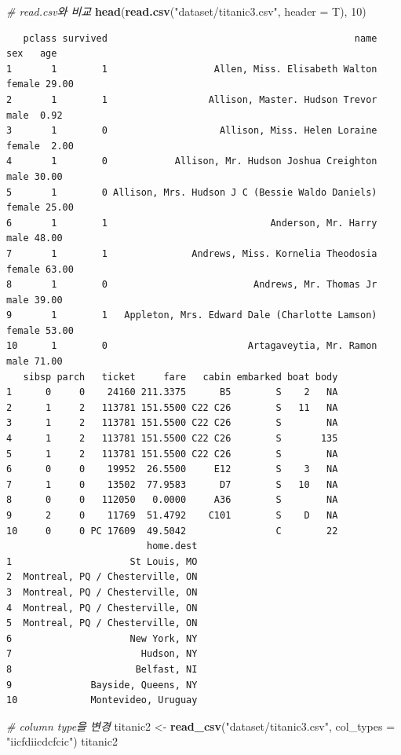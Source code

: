 \documentclass[
  11pt,
]{krantz}
\newenvironment{Shaded}{\begin{snugshade}}{\end{snugshade}}
\newcommand{\CommentTok}[1]{\textcolor[rgb]{0.37,0.37,0.37}{\textit{#1}}}
\newcommand{\DataTypeTok}[1]{\textcolor[rgb]{0.27,0.27,0.27}{#1}}
\newcommand{\DecValTok}[1]{\textcolor[rgb]{0.06,0.06,0.06}{#1}}
\newcommand{\KeywordTok}[1]{\textcolor[rgb]{0.27,0.27,0.27}{\textbf{#1}}}
\newcommand{\NormalTok}[1]{#1}
\newcommand{\StringTok}[1]{\textcolor[rgb]{0.5,0.5,0.5}{#1}}
\begin{document}
\begin{Shaded}
\begin{Highlighting}[]
\CommentTok{# read.csv와 비교}
\KeywordTok{head}\NormalTok{(}\KeywordTok{read.csv}\NormalTok{(}\StringTok{"dataset/titanic3.csv"}\NormalTok{, }\DataTypeTok{header =}\NormalTok{ T), }\DecValTok{10}\NormalTok{)}
\end{Highlighting}
\end{Shaded}

\begin{verbatim}
   pclass survived                                            name    sex   age
1       1        1                   Allen, Miss. Elisabeth Walton female 29.00
2       1        1                  Allison, Master. Hudson Trevor   male  0.92
3       1        0                    Allison, Miss. Helen Loraine female  2.00
4       1        0            Allison, Mr. Hudson Joshua Creighton   male 30.00
5       1        0 Allison, Mrs. Hudson J C (Bessie Waldo Daniels) female 25.00
6       1        1                             Anderson, Mr. Harry   male 48.00
7       1        1               Andrews, Miss. Kornelia Theodosia female 63.00
8       1        0                          Andrews, Mr. Thomas Jr   male 39.00
9       1        1   Appleton, Mrs. Edward Dale (Charlotte Lamson) female 53.00
10      1        0                         Artagaveytia, Mr. Ramon   male 71.00
   sibsp parch   ticket     fare   cabin embarked boat body
1      0     0    24160 211.3375      B5        S    2   NA
2      1     2   113781 151.5500 C22 C26        S   11   NA
3      1     2   113781 151.5500 C22 C26        S        NA
4      1     2   113781 151.5500 C22 C26        S       135
5      1     2   113781 151.5500 C22 C26        S        NA
6      0     0    19952  26.5500     E12        S    3   NA
7      1     0    13502  77.9583      D7        S   10   NA
8      0     0   112050   0.0000     A36        S        NA
9      2     0    11769  51.4792    C101        S    D   NA
10     0     0 PC 17609  49.5042                C        22
                         home.dest
1                     St Louis, MO
2  Montreal, PQ / Chesterville, ON
3  Montreal, PQ / Chesterville, ON
4  Montreal, PQ / Chesterville, ON
5  Montreal, PQ / Chesterville, ON
6                     New York, NY
7                       Hudson, NY
8                      Belfast, NI
9              Bayside, Queens, NY
10             Montevideo, Uruguay
\end{verbatim}

\begin{Shaded}
\begin{Highlighting}[]
\CommentTok{# column type을 변경}
\NormalTok{titanic2 <-}\StringTok{ }\KeywordTok{read_csv}\NormalTok{(}\StringTok{"dataset/titanic3.csv"}\NormalTok{, }
                     \DataTypeTok{col_types =} \StringTok{"iicfdiicdcfcic"}\NormalTok{)}
\NormalTok{titanic2}
\end{Highlighting}
\end{Shaded}
\end{document}
